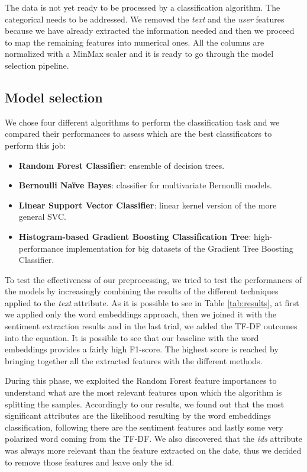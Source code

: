 \documentclass[conference]{IEEEtran}
\begin{document}
The data is not yet ready to be processed by a classification algorithm. The categorical needs to be addressed. We removed the \textit{text} and the \textit{user} features because we have already extracted the information needed and then we proceed to map the remaining features into numerical ones. All the columns are normalized with a MinMax scaler\cite{minmax} and it is ready to go through the model selection pipeline.
\subsection{Model selection}\label{sec:model}
We chose four different algorithms to perform the classification task and we compared their performances to assess which are the best classificators to perform this job:
\begin{itemize}
    \item \textbf{Random Forest Classifier\cite{rf}}: ensemble of decision trees.
    \item \textbf{Bernoulli Naïve Bayes\cite{bnb}}: classifier for multivariate Bernoulli\cite{bernoulli} models.
    \item \textbf{Linear Support Vector Classifier\cite{svc}}: linear kernel version of the more general SVC.
    \item \textbf{Histogram-based Gradient Boosting Classification Tree\cite{histgtb}}: high-performance implementation for big datasets of the Gradient Tree Boosting Classifier\cite{gtb}. 
\end{itemize}
To test the effectiveness of our preprocessing, we tried to test the performances of the models by increasingly combining the results of the different techniques applied to the \textit{text} attribute. As it is possible to see in Table \ref{tab:results}, at first we applied only the word embeddings approach, then we joined it with the sentiment extraction results and in the last trial, we added the TF-DF outcomes into the equation. It is possible to see that our baseline with the word embeddings provides a fairly high F1-score. The highest score is reached by bringing together all the extracted features with the different methods.

During this phase, we exploited the Random Forest feature importances to understand what are the most relevant features upon which the algorithm is splitting the samples. Accordingly to our results, we found out that the most significant attributes are the likelihood resulting by the word embeddings classification, following there are the sentiment features and lastly some very polarized word coming from the TF-DF. We also discovered that the \textit{ids} attribute was always more relevant than the feature extracted on the date, thus we decided to remove those features and leave only the id.
\end{document}
